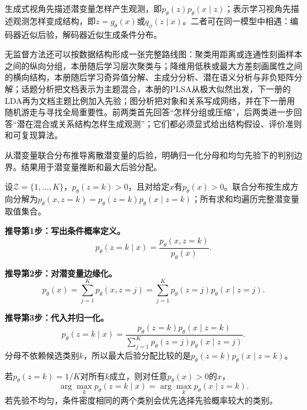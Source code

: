 生成式视角先描述潜变量怎样产生观测，即$p_\theta(z)p_\theta(x\mid z)$；表示学习视角先描述观测怎样变成结构，即$z=g_\theta(x)$或$q_\phi(z\mid x)$。二者可在同一模型中相遇：编码器近似后验，解码器近似生成条件分布。

无监督方法还可以按数据结构形成一张完整路线图：聚类用距离或连通性刻画样本之间的纵向分组，本册随后学习层次聚类与\kMeans{}；降维用低秩或最大方差刻画属性之间的横向结构，本册随后学习奇异值分解、主成分分析、潜在语义分析与非负矩阵分解；话题分析把文档表示为主题混合，本册的PLSA从极大似然出发，下一册的LDA再为文档主题比例加入先验；图分析把对象和关系写成网络，并在下一册用随机游走与\PageRank{}寻找全局重要性。前两类首先回答“怎样分组或压缩”，后两类进一步回答“潜在混合或关系结构怎样生成观测”；它们都必须显式给出结构假设、评价准则和可复现算法。

\label{struct:V4-C01-CH11}

\begin{derivationgoalbox}
从潜变量联合分布推导离散潜变量的后验，明确归一化分母和均匀先验下的判别边界。结果用于潜变量推断和最大后验分配。
\end{derivationgoalbox}
\begin{derivationprepbox}
设$\mathcal Z=\{1,\ldots,K\}$，$p_\theta(z=k)>0$，且对给定$x$有$p_\theta(x)>0$。联合分布按生成方向分解为$p_\theta(x,z=k)=p_\theta(z=k)p_\theta(x\mid z=k)$；所有求和均遍历完整潜变量取值集合。
\end{derivationprepbox}

\textbf{推导第1步：写出条件概率定义。}
\[
p_\theta(z=k\mid x)=\frac{p_\theta(x,z=k)}{p_\theta(x)}.
\]

\textbf{推导第2步：对潜变量边缘化。}
\[
p_\theta(x)=\sum_{j=1}^{K}p_\theta(x,z=j)
=\sum_{j=1}^{K}p_\theta(z=j)p_\theta(x\mid z=j).
\]

\textbf{推导第3步：代入并归一化。}
\[
p_\theta(z=k\mid x)
=\frac{p_\theta(z=k)p_\theta(x\mid z=k)}
{\sum_{j=1}^{K}p_\theta(z=j)p_\theta(x\mid z=j)}.
\]
分母不依赖候选类别$k$，所以最大后验分配比较的是$p_\theta(z=k)p_\theta(x\mid z=k)$。

\label{struct:V4-C01-CH12}
\begin{theorem}[均匀先验下的后验排序]\label{thm:V4-C01-uniform-prior}
若$p_\theta(z=k)=1/K$对所有$k$成立，则对任意$p_\theta(x)>0$的$x$，
\[
\arg\max_k p_\theta(z=k\mid x)
=\arg\max_k p_\theta(x\mid z=k).
\]
若先验不均匀，条件密度相同的两个类别会优先选择先验概率较大的类别。
\end{theorem}

